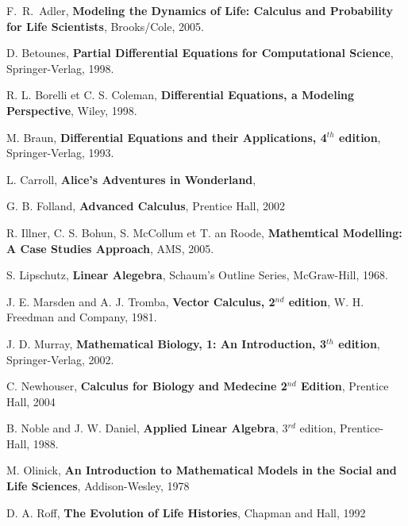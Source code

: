 \begin{thebibliography}{99}

 F.\ R.\ Adler, {\bfseries Modeling the Dynamics of Life:
Calculus and Probability for Life Scientists}, Brooks/Cole, 2005.

 D. Betounes, {\bfseries Partial Differential Equations for
Computational Science}, Springer-Verlag, 1998.

 R. L. Borelli et C. S. Coleman,
{\bfseries Differential Equations, a Modeling Perspective}, Wiley, 1998.

 M. Braun, {\bfseries Differential Equations and their
Applications, 4$^{th}$ edition}, Springer-Verlag, 1993.

 L. Carroll, {\bfseries Alice's Adventures in Wonderland},

 G. B. Folland, {\bfseries Advanced Calculus}, Prentice Hall, 2002

 R. Illner, C. S. Bohun, S. McCollum et T. an Roode,
{\bfseries Mathemtical Modelling: A Case Studies Approach}, AMS, 2005.

 S. Lipschutz, {\bfseries Linear Alegebra}, Schaum's Outline
  Series, McGraw-Hill, 1968.

 J. E. Marsden and A. J. Tromba, {\bfseries Vector
 Calculus, 2$^{nd}$ edition}, W. H. Freedman and Company, 1981.

 J. D. Murray, {\bfseries Mathematical Biology, 1: An
Introduction, 3$^{th}$ edition}, Springer-Verlag, 2002.

 C. Newhouser, {\bfseries Calculus for Biology and
Medecine 2$^{nd}$ Edition}, Prentice Hall, 2004

 B. Noble and J. W. Daniel, {\bfseries Applied Linear Algebra},
3$^{rd}$ edition, Prentice-Hall, 1988.

 M. Olinick, {\bfseries An Introduction to Mathematical Models in
the Social and Life Sciences}, Addison-Wesley, 1978

 D. A. Roff, {\bfseries The Evolution of Life Histories},
Chapman and Hall, 1992

\end{thebibliography}

